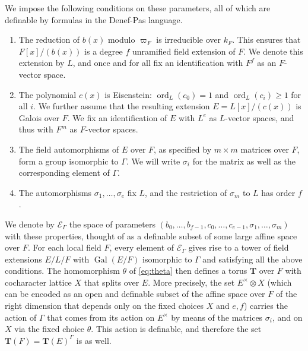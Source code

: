 \documentclass{amsart}
\newcommand{\gal}{\operatorname{Gal}}
\newcommand{\bT}{\mathbf {T}}
\newcommand\cE{{\mathcal E}}
\DeclareMathOperator{\ord}{ord}
\theoremstyle{plain}
\theoremstyle{definition}
\begin{document}
We impose the following conditions on these parameters, all of which are definable by formulas in the Denef-Pas language. 
\begin{enumerate}
\item The reduction of $b(x)$ modulo $\varpi_F$ is irreducible over $k_F$. 
This ensures that $F[x]/(b(x))$ is a degree $f$ unramified field extension of $F$. 
We denote this extension by $L$, and once and for all fix an identification with $F^f$ as 
an $F$-vector space. 
\item The polynomial $c(x)$ is Eisenstein: $\ord_L(c_0) = 1$ and $\ord_L(c_i) \ge 1$ for all $i$.
We further assume that the resulting extension $E = L[x]/(c(x))$ is Galois over $F$.
We fix an identification of $E$ with $L^e$ as $L$-vector spaces, and thus with $F^m$ as $F$-vector spaces. 
\item The field automorphisms of $E$ over $F$, as specified by $m \times m$ matrices over $F$, form a group isomorphic to $\Gamma$.
We will write $\sigma_i$ for the matrix as well as the corresponding element of $\Gamma$.
\item The automorphisms $\sigma_1, \dots, \sigma_e$ fix $L$, and the restriction of $\sigma_m$ to $L$ has order $f$.
\end{enumerate}
We denote by $\cE_\Gamma$ the space of parameters $(b_0, \dots, b_{f-1}, c_0, \dots, c_{e-1}, \sigma_1, \dots, \sigma_m)$ with these properties,
thought of as a definable subset of some large affine space over $F$.
For each local field $F$, every element of $\cE_\Gamma$ gives rise to a tower of field extensions $E/L/F$
with $\gal(E/F)$ isomorphic to $\Gamma$ and satisfying all the above conditions.
The homomorphism $\theta$ of \eqref{eq:theta} then defines a torus $\bT$ over $F$ with cocharacter lattice $X$ that splits over $E$.
More precisely, the set $E^\times \otimes X$ (which can be encoded as an open and definable subset of the affine space over $F$ of the right dimension that depends only on the fixed choices $X$ and $e, f$) carries the action of $\Gamma$ that comes from its action on $E^\times$ by means of the matrices $\sigma_i$, and on $X$ via the fixed choice $\theta$. 
This action is definable, and therefore the set $\bT(F) = \bT(E)^\Gamma$ is as well.
\end{document}
